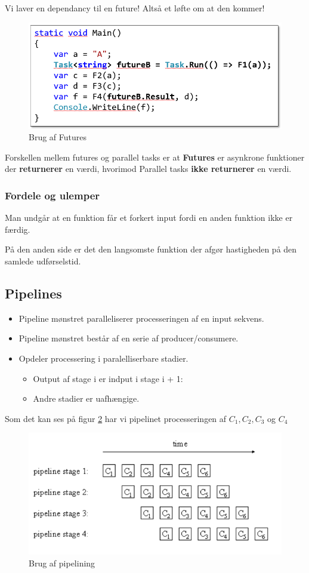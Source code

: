 Vi laver en dependancy til en future! Altså et løfte om at den kommer!

\begin{figure}[H]
	\centering
	\includegraphics[width=0.6\linewidth]{figs/pipeFut/futureB}
	\caption{Brug af Futures}
	\label{fig:FutureEx}
\end{figure}

Forskellen mellem futures og parallel tasks er at \textbf{Futures} er asynkrone funktioner der \textbf{returnerer} en værdi, hvorimod Parallel tasks \textbf{ikke returnerer} en værdi.

\subsubsection{Fordele og ulemper}

Man undgår at en funktion får et forkert input fordi en anden funktion ikke er færdig.

På den anden side er det den langsomste funktion der afgør hastigheden på den samlede udførselstid.

\subsection{Pipelines}
\begin{itemize}
	\item Pipeline mønstret paralleliserer processeringen af en input sekvens.
	\item Pipeline mønstret består af en serie af producer/consumere.
	\item Opdeler processering i paralelliserbare stadier.
	\begin{itemize}
		\item Output af stage i er indput i stage i + 1:
		\item Andre stadier er uafhængige.
	\end{itemize}
\end{itemize}

Som det kan ses på figur \ref{fig:pipelining} har vi pipelinet processeringen af $C_1, C_2, C_3$ og $C_4$ 

\begin{figure}[H]
	\centering
	\includegraphics[width=0.7\linewidth]{figs/pipeFut/stagees}
	\caption{Brug af pipelining}
	\label{fig:pipelining}
\end{figure}

